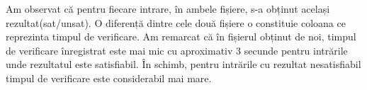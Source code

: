 Am observat că pentru fiecare intrare, în ambele fișiere, s-a obținut același rezultat(sat/unsat). O diferență dintre cele două fișiere o constituie coloana ce reprezinta timpul de verificare. Am remarcat că în fișierul obținut de noi, timpul de verificare înregistrat este mai mic cu aproximativ 3 secunde pentru intrările unde rezultatul este satisfiabil. În schimb, pentru intrările cu rezultat nesatisfiabil timpul de verificare este considerabil mai mare.